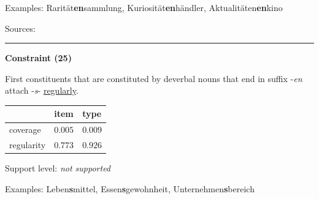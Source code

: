 \noindent
Examples: Rarität\textbf{en}sammlung, Kuriosität\textbf{en}händler, Aktualitäten\textbf{en}kino

\vspace{0.3em}

\noindent
Sources: \citet[94]{ortner_mueller-bollhagen_1991}


\hrule




\vspace{0.4em}

\begin{center}
\textbf{Constraint (25)}
\end{center}

\noindent
First constituents that are constituted by deverbal nouns that end in suffix -\textit{en} attach -\textit{s}- \underline{regularly}.
\vspace{0.35em}


\vspace{-0.35em}

\begin{table}[!ht]
\begin{center}

\begin{tabularx}{\columnwidth}{|X|X|X|}
\hline
 & item & type \\
\hline
 coverage & $0.005$ & $0.009$ \\
\hline
 regularity & $0.773$ & $0.926$ \\
\hline
\end{tabularx}
\end{center}
\end{table}

\vspace{-1.35em}

\noindent
Support level: \textit{not supported}

\vspace{0.3em}

\noindent
Examples: Leben\textbf{s}mittel, Essen\textbf{s}gewohnheit, Unternehmen\textbf{s}bereich

